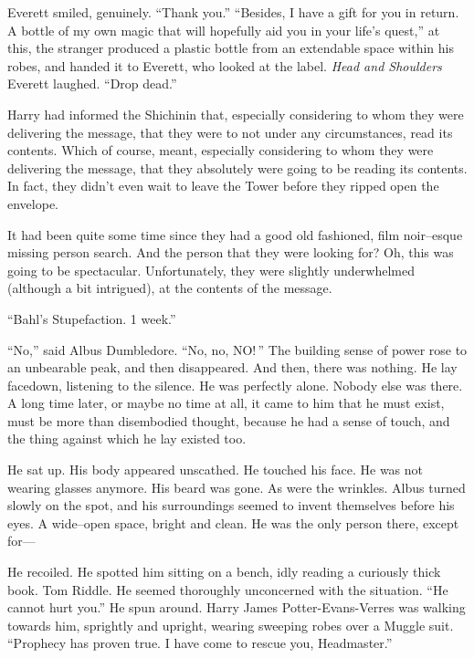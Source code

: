 Everett smiled, genuinely. “Thank you.”
\SmallVSpace
“Besides, I have a gift for you in return. A bottle of my own magic that will hopefully aid you in your life’s quest,” at this, the stranger produced a plastic bottle from an extendable space within his robes, and handed it to Everett, who looked at the label.
\SomeVSpace
\textit{Head and Shoulders}
\SomeVSpace
Everett laughed. “Drop dead.”
\simpleline


Harry had informed the Shichinin that, especially considering to whom they were delivering the message, that they were to not under any circumstances, read its contents. Which of course, meant, especially considering to whom they were delivering the message, that they absolutely were going to be reading its contents. In fact, they didn’t even wait to leave the Tower before they ripped open the envelope.

It had been quite some time since they had a good old fashioned, film noir\mbox{--}esque missing person search. And the person that they were looking for? Oh, this was going to be spectacular. Unfortunately, they were slightly underwhelmed (although a bit intrigued), at the contents of the message.
\begin{writtenNote}
“Bahl’s Stupefaction. 1 week.”
\end{writtenNote}
\simpleline
{}

“No,” said Albus Dumbledore. “No, no, NO! ”
\SmallVSpace
The building sense of power rose to an unbearable peak, and then disappeared.
\SmallVSpace
And then, there was nothing.
\SmallVSpace
He lay facedown, listening to the silence. He was perfectly alone. Nobody else was there. A long time later, or maybe no time at all, it came to him that he must exist, must be more than disembodied thought, because he had a sense of touch, and the thing against which he lay existed too.

He sat up. His body appeared unscathed. He touched his face. He was not wearing glasses anymore. His beard was gone. As were the wrinkles.
\SmallVSpace
Albus turned slowly on the spot, and his surroundings seemed to invent themselves before his eyes. A wide\mbox{--}open space, bright and clean. He was the only person there, except for\mbox{---}

He recoiled. He spotted him sitting on a bench, idly reading a curiously thick book. Tom Riddle. He seemed thoroughly unconcerned with the situation.
\SmallVSpace
“He cannot hurt you.” He spun around. Harry James Potter-Evans-Verres was walking towards him, sprightly and upright, wearing sweeping robes over a Muggle suit.  “Prophecy has proven true. I have come to rescue you, Headmaster.”

